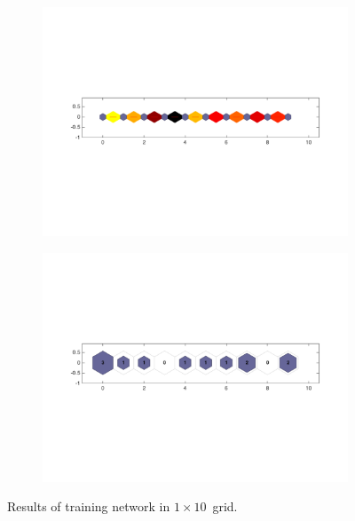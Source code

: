     \begin{figure}
        \begin{subfigure}[b]{0.5\textwidth}
            \centering
            \includegraphics[width=\textwidth]{../images/1d/apps/dist_1_by_10.png}
        \end{subfigure}
        \hfill
        \begin{subfigure}[b]{0.5\textwidth}
             \includegraphics[width=\textwidth]{../images/1d/apps/hit_t_1_by_10.png}
        \end{subfigure}
                \caption{Results of training network in $1\times10$~grid.}
         \label{fig: 1by10T}
    \end{figure}

